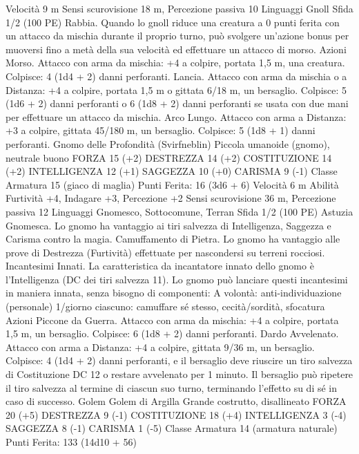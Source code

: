 \begin{multicols}{2}
Velocità 9 m
Sensi scurovisione 18 m, Percezione passiva 10
Linguaggi Gnoll
Sfida 1/2 (100 PE)
Rabbia. Quando lo gnoll riduce una creatura a 0 punti ferita con
un attacco da mischia durante il proprio turno, può svolgere
un’azione bonus per muoversi fino a metà della sua velocità ed
effettuare un attacco di morso.
Azioni
Morso. Attacco con arma da mischia: +4 a colpire, portata 1,5
m, una creatura.
Colpisce: 4 (1d4 + 2) danni perforanti.
Lancia. Attacco con arma da mischia o a Distanza: +4 a colpire,
portata 1,5 m o gittata 6/18 m, un bersaglio.
Colpisce: 5 (1d6 + 2) danni perforanti o 6 (1d8 + 2) danni
perforanti se usata con due mani per effettuare un attacco da
mischia.
Arco Lungo. Attacco con arma a Distanza: +3 a colpire, gittata
45/180 m, un bersaglio.
Colpisce: 5 (1d8 + 1) danni perforanti.
Gnomo delle
Profondità (Svirfneblin)
Piccola umanoide (gnomo), neutrale buono
FORZA 15 (+2)
DESTREZZA 14 (+2)
COSTITUZIONE 14 (+2)
INTELLIGENZA 12 (+1)
SAGGEZZA 10 (+0)
CARISMA 9 (-1)
Classe Armatura 15 (giaco di maglia)
\hspace*{0pt}\hfill{Punti Ferita}: 16 (3d6 + 6)
Velocità 6 m
Abilità Furtività +4, Indagare +3, Percezione +2
Sensi scurovisione 36 m, Percezione passiva 12
Linguaggi Gnomesco, Sottocomune, Terran
Sfida 1/2 (100 PE)
Astuzia Gnomesca. Lo gnomo ha vantaggio ai tiri salvezza di
Intelligenza, Saggezza e Carisma contro la magia.
Camuffamento di Pietra. Lo gnomo ha vantaggio alle prove di
Destrezza (Furtività) effettuate per nascondersi su terreni
rocciosi.
Incantesimi Innati. La caratteristica da incantatore innato dello
gnomo è l’Intelligenza (DC dei tiri salvezza 11). Lo gnomo può
lanciare questi incantesimi in maniera innata, senza bisogno di
componenti:
A volontà: anti-individuazione (personale)
1/giorno ciascuno: camuffare sé stesso, cecità/sordità, sfocatura
Azioni
Piccone da Guerra. Attacco con arma da mischia: +4 a colpire,
portata 1,5 m, un bersaglio.
Colpisce: 6 (1d8 + 2) danni perforanti.
Dardo Avvelenato. Attacco con arma a Distanza: +4 a colpire,
gittata 9/36 m, un bersaglio.
Colpisce: 4 (1d4 + 2) danni perforanti, e il bersaglio deve
riuscire un tiro salvezza di Costituzione DC 12 o restare
avvelenato per 1 minuto. Il bersaglio può ripetere il tiro salvezza
al termine di ciascun suo turno, terminando l’effetto su di sé in
caso di successo.
Golem
Golem di Argilla
Grande costrutto, disallineato
FORZA 20 (+5)
DESTREZZA 9 (-1)
COSTITUZIONE 18 (+4)
INTELLIGENZA 3 (-4)
SAGGEZZA 8 (-1)
CARISMA 1 (-5)
Classe Armatura 14 (armatura naturale)
\hspace*{0pt}\hfill{Punti Ferita}: 133 (14d10 + 56)

\end{multicols}
